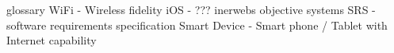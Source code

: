 glossary
WiFi - Wireless fidelity
iOS - ??? inerwebs objective systems
SRS - software requirements specification
Smart Device - Smart phone / Tablet with Internet capability